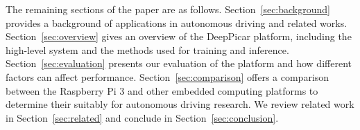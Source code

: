 The remaining sections of the paper are as follows.
Section~\ref{sec:background}
provides a background of applications in autonomous driving and related works.
Section~\ref{sec:overview} gives an overview of the DeepPicar
platform, including the high-level system and the methods used for
training and inference. Section~\ref{sec:evaluation} presents our
evaluation of the platform and how different factors can affect
performance. Section~\ref{sec:comparison} offers a comparison between  
the Raspberry Pi 3 and other embedded computing platforms to 
determine their suitably for autonomous driving research.
We review related work in
Section~\ref{sec:related} and conclude in
Section~\ref{sec:conclusion}.

